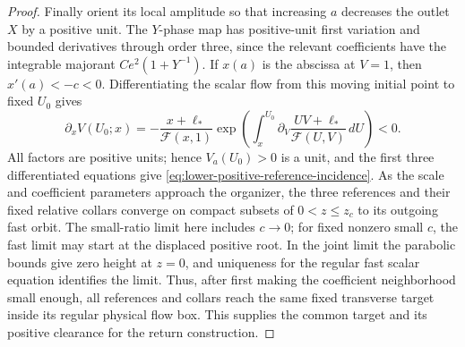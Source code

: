 \begin{proof}
Finally orient its local amplitude so that increasing $a$ decreases the
outlet $X$ by a positive unit.  The $Y$-phase map has positive-unit first
variation and bounded derivatives through order three, since the relevant
coefficients have the integrable majorant $Ce^2(1+Y^{-1})$.  If $x(a)$
is the abscissa at $V=1$, then $x'(a)<-c<0$.  Differentiating the scalar
flow from this moving initial point to fixed $U_0$ gives
\[
 \partial_xV(U_0;x)
 =-\frac{x+\ell_*}{\mathcal F(x,1)}
   \exp\left(\int_x^{U_0}\partial_V
       \frac{UV+\ell_*}{\mathcal F(U,V)}\,dU\right)<0.
\]
All factors are positive units; hence $V_a(U_0)>0$ is a unit, and the
first three differentiated equations give
\eqref{eq:lower-positive-reference-incidence}.
As the scale and coefficient parameters approach the organizer, the
three references and their fixed relative collars converge on compact
subsets of $0<z\le z_c$ to its outgoing fast orbit. The small-ratio limit
here includes $c\to0$; for fixed nonzero small $c$, the fast limit may
start at the displaced positive root. In the joint limit the parabolic
bounds give zero height at $z=0$, and uniqueness for the regular fast
scalar equation identifies the limit. Thus, after first making the
coefficient neighborhood small enough, all references and collars reach
the same fixed transverse target inside its regular physical flow box.
This supplies the common target and its positive clearance for the return
construction.
\end{proof}


